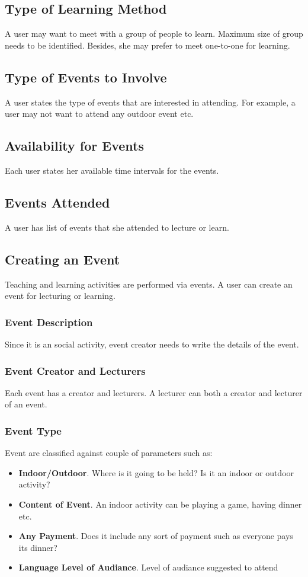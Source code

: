  \subsection{Type of Learning Method}  A user may want to meet with a group of people to learn. Maximum size of group needs to be identified. Besides, she may prefer to meet one-to-one for learning.
 \subsection{Type of Events to Involve} A user states the type of events that are interested in attending. For example, a user may not want to attend any outdoor event etc.
 \subsection{Availability for Events} Each user states her available time intervals for the events.
 \subsection{Events Attended} A user has list of events that she attended to lecture or learn. 
 \subsection{Creating an Event} Teaching and learning activities are performed via events. A user can create an event for lecturing or learning.
 \subsubsection{Event Description} Since it is an social activity, event creator needs to write the details of the event.
 \subsubsection{Event Creator and Lecturers} Each event has a creator and lecturers. A lecturer can both a creator and lecturer of an event. 
 \subsubsection{Event Type} Event are classified against couple of parameters such as:
 \begin{itemize}
 \item \textbf{Indoor/Outdoor}. Where is it going to be held? Is it an indoor or outdoor activity?
   \item \textbf{Content of Event}. An indoor activity can be playing a game, having dinner etc.
   \item \textbf{Any Payment}. Does it include any sort of payment such as everyone pays its dinner?
     \item \textbf{Language Level of Audiance}. Level of audiance suggested to attend
 \end{itemize}
